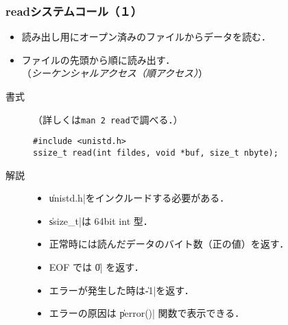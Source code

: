 \documentclass{beamer}                 %
\begin{document}
\begin{frame}[fragile]
  \frametitle{readシステムコール（１）}
\begin{itemize}
\item 読み出し用にオープン済みのファイルからデータを読む．
\item ファイルの先頭から順に読み出す．\\
（\emph{シーケンシャルアクセス（順アクセス）}）
\end{itemize}

\begin{description}
\item[書式]（詳しくは\texttt{man 2 read}で調べる．）

\begin{lstlisting}
#include <unistd.h>
ssize_t read(int fildes, void *buf, size_t nbyte);
\end{lstlisting}

\item[解説]
\begin{itemize}
\item \|unistd.h|をインクルードする必要がある．
\item \|ssize_t|は 64bit int 型．
\item 正常時には読んだデータのバイト数（正の値）を返す．
\item EOF では \|0| を返す．
\item エラーが発生した時は\|-1|を返す．
\item エラーの原因は \|perror()| 関数で表示できる．
\end{itemize}

\end{description}
\end{frame}
\end{document}
